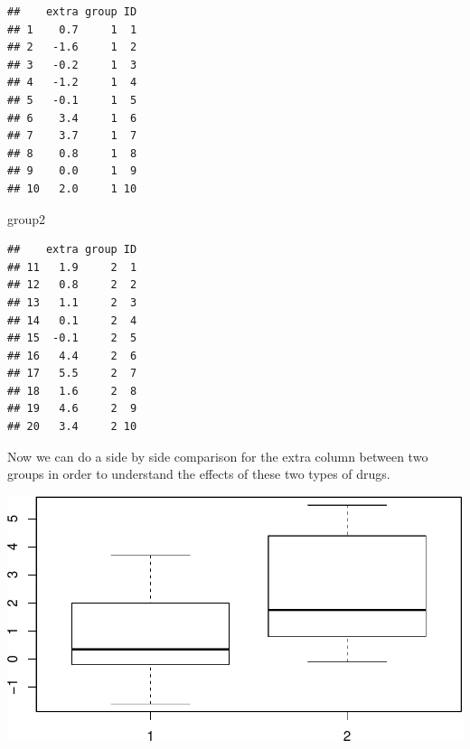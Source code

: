 \documentclass[]{article}
\newenvironment{Shaded}{\begin{snugshade}}{\end{snugshade}}
\newcommand{\KeywordTok}[1]{\textcolor[rgb]{0.13,0.29,0.53}{\textbf{#1}}}
\newcommand{\NormalTok}[1]{#1}
\newcommand{\OperatorTok}[1]{\textcolor[rgb]{0.81,0.36,0.00}{\textbf{#1}}}
\begin{document}
\begin{verbatim}
##    extra group ID
## 1    0.7     1  1
## 2   -1.6     1  2
## 3   -0.2     1  3
## 4   -1.2     1  4
## 5   -0.1     1  5
## 6    3.4     1  6
## 7    3.7     1  7
## 8    0.8     1  8
## 9    0.0     1  9
## 10   2.0     1 10
\end{verbatim}

\begin{Shaded}
\begin{Highlighting}[]
\NormalTok{group2}
\end{Highlighting}
\end{Shaded}

\begin{verbatim}
##    extra group ID
## 11   1.9     2  1
## 12   0.8     2  2
## 13   1.1     2  3
## 14   0.1     2  4
## 15  -0.1     2  5
## 16   4.4     2  6
## 17   5.5     2  7
## 18   1.6     2  8
## 19   4.6     2  9
## 20   3.4     2 10
\end{verbatim}

Now we can do a side by side comparison for the extra column between two
groups in order to understand the effects of these two types of drugs.

\begin{Shaded}
\end{Shaded}

\includegraphics{RMarkdown-Example_files/figure-latex/unnamed-chunk-12-1.pdf}
\end{document}
